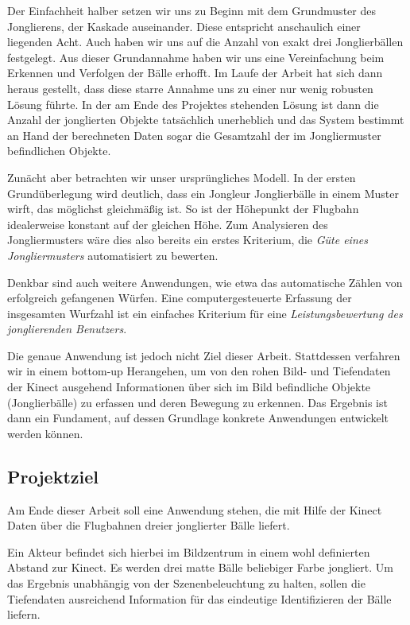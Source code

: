 \documentclass[12pt,a4paper,ngerman]{scrartcl}
\begin{document}
Der Einfachheit halber setzen wir uns zu Beginn mit dem Grundmuster des Jonglierens,
der Kaskade auseinander. Diese entspricht anschaulich einer liegenden Acht. Auch
haben wir uns auf die Anzahl von exakt drei Jonglierbällen festgelegt. Aus dieser
Grundannahme haben wir uns eine Vereinfachung beim Erkennen und Verfolgen der Bälle
erhofft. Im Laufe der Arbeit hat sich dann heraus gestellt, dass diese starre Annahme
uns zu einer nur wenig robusten Lösung führte. In der am Ende des Projektes
stehenden Lösung ist dann die Anzahl der jonglierten Objekte tatsächlich unerheblich
und das System bestimmt an Hand der berechneten Daten sogar die Gesamtzahl der
im Jongliermuster befindlichen Objekte.

Zunächt aber betrachten wir unser ursprüngliches Modell. In der ersten
Grundüberlegung wird deutlich, dass ein Jongleur Jonglierbälle
in einem Muster wirft, das möglichst gleichmäßig ist.
So ist der Höhepunkt der Flugbahn idealerweise konstant auf der gleichen Höhe.
Zum Analysieren des Jongliermusters wäre dies also bereits ein erstes Kriterium,
die \textit{Güte eines Jongliermusters} automatisiert zu bewerten.

Denkbar sind auch weitere Anwendungen, wie etwa das automatische Zählen von
erfolgreich gefangenen Würfen. Eine computergesteuerte Erfassung der insgesamten
Wurfzahl ist ein einfaches Kriterium für eine \textit{Leistungsbewertung des
jonglierenden Benutzers}.

Die genaue Anwendung ist jedoch nicht Ziel dieser Arbeit. Stattdessen verfahren wir
in einem bottom-up Herangehen, um von den rohen Bild- und Tiefendaten der Kinect
ausgehend Informationen über sich im Bild befindliche Objekte (Jonglierbälle) zu
erfassen und deren Bewegung zu erkennen. Das Ergebnis ist dann ein Fundament, auf
dessen Grundlage konkrete Anwendungen entwickelt werden können.

\subsection{Projektziel}

Am Ende dieser Arbeit soll eine Anwendung stehen, die mit Hilfe der Kinect Daten
über die Flugbahnen dreier jonglierter Bälle liefert.

Ein Akteur befindet sich hierbei im Bildzentrum in einem wohl definierten Abstand
zur Kinect. Es werden drei matte Bälle beliebiger Farbe jongliert. Um das Ergebnis
unabhängig von der Szenenbeleuchtung zu halten, sollen die Tiefendaten ausreichend
Information für das eindeutige Identifizieren der Bälle liefern.
\end{document}
